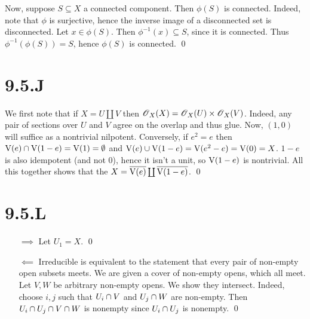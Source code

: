 \documentclass{article}
\begin{document}
Now, suppose $S \subseteq X$ a connected component. Then
$\phi(S)$ is connected. Indeed, note that $\phi$
is surjective, hence the inverse image of a disconnected set is disconnected.
Let $x \in \phi(S)$. Then $\phi^{-1}(x) \subseteq S$, since it is
connected. Thus $\phi^{-1}(\phi(S)) = S$, hence $\phi(S)$ is
connected. \qed

\section{9.5.J}
We first note that if $X=U \coprod V$ then $\operatorname{\mathscr{O}}_X(X)=\operatorname{\mathscr{O}}_X(U) \times \operatorname{\mathscr{O}}_X(V)$.
Indeed, any pair of sections over $U$ and
$V$ agree on the overlap and thus glue. Now,
$(1,0)$ will suffice as a nontrivial nilpotent. Conversely, if
$e^2=e$ then $\operatorname{V}(e) \cap \operatorname{V}(1-e)
    =\operatorname{V}(1)= \emptyset$ and
$\operatorname{V}(e) \cup
    \operatorname{V}(1-e)=\operatorname{V}(e^2-e)=\operatorname{V}(0)=X$. $1-e$ is also idempotent (and not
0), hence it isn't a unit, so $\operatorname{V}(1-e)$ is nontrivial. All this
together shows that the $X=\overline{\operatorname{V}(e)} \coprod \overline{\operatorname{V}(1-e)}$. \qed

\section{9.5.L}
\begin{itemize}
    \item[$\implies$] Let $U_1=X$. \qed
    \item[$\impliedby$] Irreducible is equivalent to the statement that every
          pair of non-empty open subsets meets. We are given a cover of non-empty opens,
          which all meet. Let $V, W$ be arbitrary non-empty opens. We
          show they intersect. Indeed, choose $i, j$ such that
          $U_i \cap V$ and $U_j \cap W$ are non-empty. Then
          $U_i \cap U_j \cap V \cap W$ is nonempty since $U_i \cap U_j$ is nonempty.
          \qed
\end{itemize}
\end{document}
